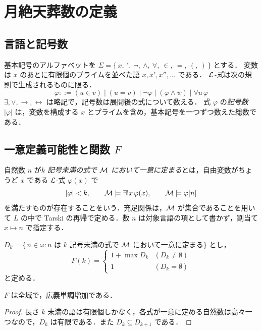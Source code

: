 \section{月絶天葬数の定義}\label{sec:def}

\subsection{言語と記号数}
基本記号のアルファベットを $\Sigma=\{\,x,\ {}',\ \neg,\ \wedge,\ \forall,\ \in,\ =,\ (,\ )\,\}$ とする．
変数は $x$ のあとに有限個のプライムを並べた語 $x, x', x'', \dots$ である．
\emph{$\mathcal{L}$-式}は次の規則で生成されるものに限る．
\[ \varphi ::= (u\in v) \mid (u=v) \mid \neg\varphi \mid (\varphi\wedge\psi) \mid \forall u\,\varphi \]
$\exists,\vee,\to,\leftrightarrow$ は略記で，記号数は展開後の式について数える．
式 $\varphi$ の\emph{記号数} $|\varphi|$ は，変数を構成する $x$ とプライムを含め，基本記号を一つずつ数えた総数である．

\subsection{一意定義可能性と関数 $F$}
\begin{definition}
自然数 $n$ が\emph{$k$ 記号未満の式で $\mathcal{M}$ において一意に定まる}とは，自由変数がちょうど $x$ である $\mathcal{L}$-式 $\varphi(x)$ で
\[ |\varphi|<k,\qquad \mathcal{M}\models\exists!x\,\varphi(x),\qquad \mathcal{M}\models\varphi[n] \]
を満たすものが存在することをいう．充足関係は，$\mathcal{M}$ が集合であることを用いて $L$ の中で Tarski の再帰で定める．数 $n$ は対象言語の項として書かず，割当て $x\mapsto n$ で指定する．
\end{definition}

\begin{definition}
$D_k=\{\,n\in\omega : n$ は $k$ 記号未満の式で $\mathcal{M}$ において一意に定まる$\}$ とし，
\[ F(k) = \begin{cases} 1+\max D_k & (D_k\neq\emptyset)\\ 1 & (D_k=\emptyset)\end{cases} \]
と定める．
\end{definition}

\begin{proposition}
$F$ は全域で，広義単調増加である．
\end{proposition}
\begin{proof}
長さ $k$ 未満の語は有限個しかなく，各式が一意に定める自然数は高々一つなので，$D_k$ は有限である．また $D_k\subseteq D_{k+1}$ である．
\end{proof}

